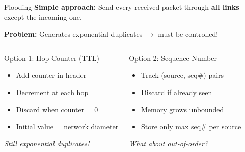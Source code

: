 \documentclass[aspectratio=169,11pt]{beamer}
\begin{document}
\begin{frame}{Flooding}
    \textbf{Simple approach:} Send every received packet through \textbf{all links} except the incoming one.
    
    \vspace{0.3cm}
    \textbf{Problem:} Generates exponential duplicates $\rightarrow$ must be controlled!
    
    \vspace{0.3cm}
    \begin{columns}
        \begin{block}{Option 1: Hop Counter (TTL)}
            \begin{itemize}
                \item Add counter in header
                \item Decrement at each hop
                \item Discard when counter = 0
                \item Initial value = network diameter
            \end{itemize}
            \textit{Still exponential duplicates!}
        \end{block}
        
        \begin{block}{Option 2: Sequence Number}
            \begin{itemize}
                \item Track (source, seq\#) pairs
                \item Discard if already seen
                \item Memory grows unbounded
                \item Store only max seq\# per source
            \end{itemize}
            \textit{What about out-of-order?}
        \end{block}
    \end{columns}
\end{frame}
\end{document}
